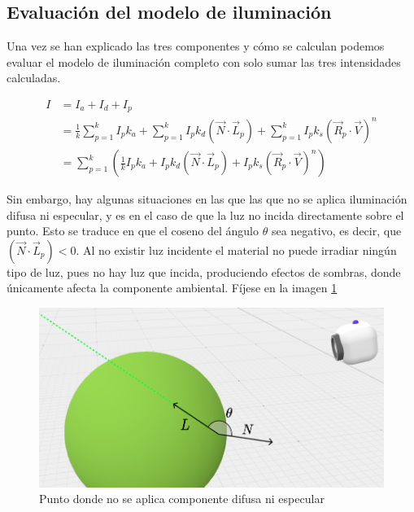 \subsection{Evaluación del modelo de iluminación}

Una vez se han explicado las tres componentes y cómo se calculan podemos evaluar el modelo de iluminación completo con solo sumar las tres intensidades calculadas.

\begin{equation}
    \label{eq:phong}
    \begin{split}
        I &= I_a + I_d + I_p \\
        &=\frac{1}{k}\sum_{p=1}^k I_p k_a + \sum_{p=1}^{k}I_p k_d (\vec N\cdot \vec L_p) + \sum_{p=1}^{k} I_p k_s (\vec R_p\cdot \vec V)^n \\
        &=\sum_{p=1}^{k}\left(\frac{1}{k}I_p k_a + I_p k_d (\vec N\cdot \vec L_p) +  I_p k_s (\vec R_p\cdot \vec V)^n\right)
    \end{split}
\end{equation}

Sin embargo, hay algunas situaciones en las que las que no se aplica iluminación difusa ni especular, y es en el caso de que la luz no incida directamente sobre el punto. Esto se traduce en que el coseno del ángulo $\theta$ sea negativo, es decir, que $(\vec N\cdot \vec L_p)<0$. Al no existir luz incidente el material no puede irradiar ningún tipo de luz, pues no hay luz que incida, produciendo efectos de sombras, donde únicamente afecta la componente ambiental. Fíjese en la imagen \ref{fig:excepcion}

\begin{figure} [ht]
    \centering
    \includegraphics[scale = 0.3]{img/C7/excepcion.png}
    \caption{Punto donde no se aplica componente difusa ni especular}
    \label{fig:excepcion}
\end{figure}


